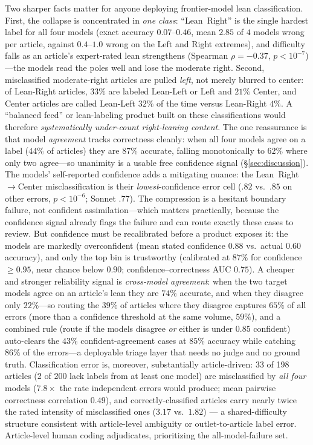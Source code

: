 \documentclass{article}
\begin{document}
Two sharper facts matter for anyone deploying frontier-model lean
classification. First, the collapse is concentrated in \emph{one class}:
``Lean~Right'' is the single hardest label for all four models
(exact accuracy $0.07$--$0.46$, mean $2.85$ of $4$ models wrong per
article, against $0.4$--$1.0$ wrong on the Left and Right extremes), and
difficulty falls as an article's expert-rated lean strengthens
(Spearman $\rho{=}-0.37$, $p{<}10^{-7}$)---the models read the poles
well and lose the moderate right. Second, misclassified moderate-right
articles are pulled \emph{left}, not merely blurred to center: of
Lean-Right articles, $33\%$ are labeled Lean-Left or Left and $21\%$
Center, and Center articles are called Lean-Left $32\%$ of the time
versus Lean-Right $4\%$. A ``balanced feed'' or lean-labeling product
built on these classifications would therefore \emph{systematically
under-count right-leaning content}. The one reassurance is that
model \emph{agreement} tracks correctness cleanly: when all four models
agree on a label ($44\%$ of articles) they are $87\%$ accurate, falling
monotonically to $62\%$ where only two agree---so unanimity is a usable
free confidence signal (\S\ref{sec:discussion}).
The models' self-reported confidence adds a mitigating nuance: the
Lean~Right$\to$Center misclassification is their \emph{lowest}-confidence
error cell ($.82$ vs.\ $.85$ on other errors, $p<10^{-6}$; Sonnet
$.77$). The compression is a hesitant boundary failure, not confident
assimilation---which matters practically, because the
confidence signal already flags the failure and can route exactly these
cases to review. But confidence must be recalibrated before a product
exposes it: the models are markedly overconfident (mean stated
confidence $0.88$ vs.\ actual $0.60$ accuracy), and only the top bin is
trustworthy (calibrated at $87\%$ for confidence ${\ge}0.95$, near
chance below $0.90$; confidence--correctness AUC $0.75$). A cheaper and
stronger reliability signal is \emph{cross-model agreement}: when the
two target models agree on an article's lean they are $74\%$ accurate,
and when they disagree only $22\%$---so routing the $39\%$ of articles
where they disagree captures $65\%$ of all errors (more than a
confidence threshold at the same volume, $59\%$), and a combined rule
(route if the models disagree \emph{or} either is under $0.85$
confident) auto-clears the $43\%$ confident-agreement cases at $85\%$
accuracy while catching $86\%$ of the errors---a deployable triage layer
that needs no judge and no ground truth. Classification error is, moreover, substantially article-driven: 33 of
198 articles (2 of 200 lack labels from at least one model) are
misclassified by \emph{all four} models ($7.8\times$
the rate independent errors would produce; mean pairwise correctness
correlation $0.49$), and correctly-classified articles carry nearly
twice the rated intensity of misclassified ones ($3.17$ vs.\ $1.82$)
--- a shared-difficulty structure consistent with article-level
ambiguity or outlet-to-article label error. Article-level human coding
adjudicates, prioritizing the all-model-failure set.
\end{document}
